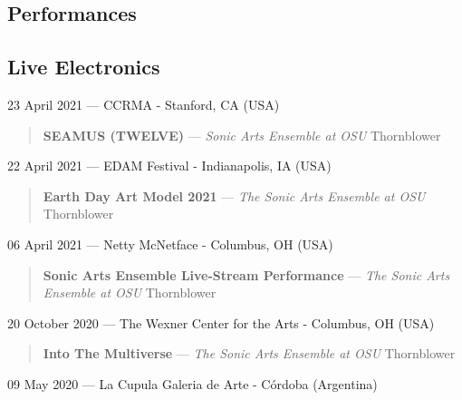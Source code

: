 \documentclass[12pt,overlapped]{res}%
\begin{document}
\begin{resume}
\section{Performances}%
%
%
%
\subsection{Live Electronics}%
23 April 2021 --- CCRMA - Stanford, CA (USA)%
\begin{quote}
\par
\textbf{SEAMUS (TWELVE)} ---
\textit{Sonic Arts Ensemble at OSU}
Thornblower
\end{quote}%
%
%
%
22 April 2021 --- EDAM Festival - Indianapolis, IA (USA)%
\begin{quote}
\par
\textbf{Earth Day Art Model 2021} ---
\textit{The Sonic Arts Ensemble at OSU}
Thornblower
\end{quote}%
%
%
%
06 April 2021 --- Netty McNetface - Columbus, OH (USA)%
\begin{quote}
\par
\textbf{Sonic Arts Ensemble Live{-}Stream Performance} ---
\textit{The Sonic Arts Ensemble at OSU}
Thornblower
\end{quote}%
%
%
%
20 October 2020 --- The Wexner Center for the Arts - Columbus, OH (USA)%
\begin{quote}
\par
\textbf{Into The Multiverse} --- \textit{The Sonic Arts Ensemble at OSU}
Thornblower
\end{quote}%
%
%
%
09 May 2020 --- La Cupula Galeria de Arte - Córdoba (Argentina)%

\end{resume}
\end{document}
